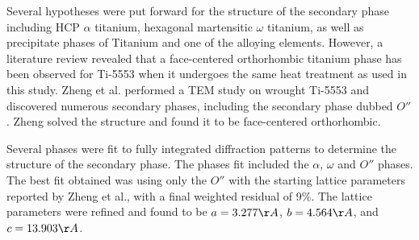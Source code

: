 Several hypotheses were put forward for the structure of the secondary phase including HCP $\alpha$ titanium, hexagonal martensitic $\omega$ titanium, as well as precipitate phases of Titanium and one of the alloying elements. However, a literature review revealed that a face-centered orthorhombic titanium phase has been observed for Ti-5553 when it undergoes the same heat treatment as used in this study. Zheng et al. performed a TEM study on wrought Ti-5553 and discovered numerous secondary phases, including the secondary phase dubbed $O''$ \cite{Zheng2016}. Zheng solved the structure and found it to be face-centered orthorhombic.

Several phases were fit to fully integrated diffraction patterns to determine the structure of the secondary phase. The phases fit included the $\alpha$, $\omega$ and $O''$ phases. The best fit obtained was using only the $O''$ with the starting lattice parameters reported by Zheng et al., with a final weighted residual of 9\%. The lattice parameters were refined and found to be $a = 3.277\AA$, $b = 4.564 \AA$, and $c = 13.903 \AA$. 